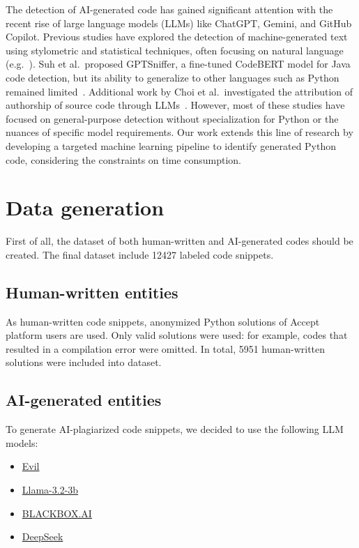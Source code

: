 \documentclass{article}
\begin{document}
The detection of AI-generated code has gained significant attention with the recent rise of large language models (LLMs) like ChatGPT, Gemini, and GitHub Copilot. Previous studies have explored the detection of machine-generated text using stylometric and statistical techniques, often focusing on natural language (e.g.~\cite{Su2020}). Suh et al.\ proposed GPTSniffer, a fine-tuned CodeBERT model for Java code detection, but its ability to generalize to other languages such as Python remained limited~\cite{Suh24}. Additional work by Choi et al.\ investigated the attribution of authorship of source code through LLMs~\cite{Choi2025}. However, most of these studies have focused on general-purpose detection without specialization for Python or the nuances of specific model requirements. Our work extends this line of research by developing a targeted machine learning pipeline to identify generated Python code, considering the constraints on time consumption.

\section{Data generation}

First of all, the dataset of both human-written and AI-generated codes should be created. The final dataset include 12427 labeled code snippets.

\subsection{Human-written entities}

As human-written code snippets, anonymized Python solutions of Accept~\cite{Beresnev} platform users are used. Only valid solutions were used: for example, codes that resulted in a compilation error were omitted. In total, 5951 human-written solutions were included into dataset.

\subsection{AI-generated entities}

To generate AI-plagiarized code snippets, we decided to use the following LLM models:
\begin{itemize}
  \item \href{https://huggingface.co/DavidAU/L3.1-Evil-Reasoning-Dark-Planet-Hermes-R1-Uncensored-8B?not-for-all-audiences=true}{Evil}
  \item \href{https://huggingface.co/meta-llama/Llama-3.2-3B}{Llama-3.2-3b}
  \item \href{https://www.blackbox.ai/}{BLACKBOX.AI}
  \item \href{https://chat.deepseek.com/}{DeepSeek}
\end{itemize}
\end{document}
